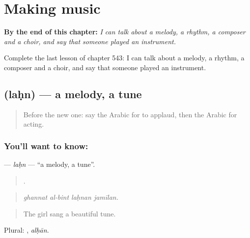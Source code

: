 
\chapter{Making music}
\label{ch:ar-making-music}

\begin{chapteropening}
\textbf{By the end of this chapter:} \emph{I can talk about a melody, a rhythm, a composer and a choir, and say that someone played an instrument.}

Complete the last lesson of chapter 543: I can talk about a melody, a rhythm, a composer and a choir, and say that someone played an instrument.
\end{chapteropening}

\section[\texorpdfstring{\ar{لحن} (laḥn)}{لحن (laḥn)}]{ (laḥn) — a melody, a tune}

\label{lesson:AR-C543-lahn}



\begin{quote}
Before the new one: say the Arabic for to applaud, then the Arabic for acting.
\end{quote}

\subsection*{You'll want to know: }
\textbf{} — \emph{laḥn} — \textquotedblleft{}a melody, a tune\textquotedblright{}.

\begin{quote}
   .
\end{quote}

\begin{quote}
\emph{ghannat al-bint laḥnan jamīlan.}
\end{quote}

\begin{quote}
The girl sang a beautiful tune.
\end{quote}

Plural: , \emph{alḥān}.

